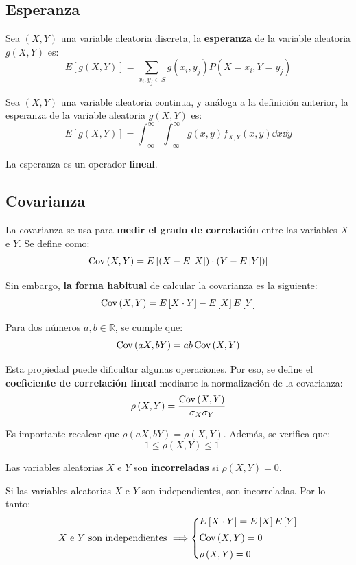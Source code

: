 \documentclass[a4paper]{book}
\begin{document}
\subsection{Esperanza}

Sea $\left(X,Y\right)$ una variable aleatoria discreta, la \textbf{esperanza} de la variable aleatoria $g\left(X,Y\right)$ es:
\[E\left[g\left(X,Y\right)\right] = \sum_{x_i,y_j\in S}g\left(x_i,y_j\right)P\left(X=x_i, Y=y_j\right)\]

Sea $\left(X,Y\right)$ una variable aleatoria continua, y análoga a la definición anterior, la esperanza de la variable aleatoria $g\left(X,Y\right)$ es:
\[E\left[g\left(X,Y\right)\right] = \int_{-\infty}^{\infty}\int_{-\infty}^{\infty}g\left(x,y\right)f_{X,Y}(x,y)\dd{x} \dd{y}\]

La esperanza es un operador \textbf{lineal}.

\subsection{Covarianza}

La covarianza se usa para \textbf{medir el grado de correlación} entre las variables $X$ e $Y$. Se define como:
\[\operatorname{Cov} \left( X,Y \right) = E \left[\left(X-E\left[X\right]\right) \cdot \left(Y - E\left[Y\right]\right)\right]\]

Sin embargo, \textbf{la forma habitual} de calcular la covarianza es la siguiente:
\[\operatorname{Cov} \left( X,Y \right) = E\left[X\cdot Y\right] - E\left[X\right]E\left[Y\right]\]

Para dos números $a,b \in \mathbb{R}$, se cumple que:
\[\operatorname{Cov} \left( aX,bY \right) = ab\operatorname{Cov} \left( X,Y \right)\]

Esta propiedad puede dificultar algunas operaciones. Por eso, se define el \textbf{coeficiente de correlación lineal} mediante la normalización de la covarianza:
\[\rho \left(X,Y\right) = \frac{\operatorname{Cov} \left( X,Y \right)}{\sigma _X \sigma _Y} \]

Es importante recalcar que $\rho \left( aX,bY \right) = \rho \left( X,Y \right) $. Además, se verifica que:
\[-1\leq \rho \left( X,Y \right) \leq 1 \]

Las variables aleatorias $X$ e $Y$ son \textbf{incorreladas} si $\rho \left( X,Y \right)=0$.

Si las variables aleatorias $X$ e $Y$ son independientes, son incorreladas. Por lo tanto:
\[X \text{ e } Y \text{ son independientes} \ \Longrightarrow \left\lbrace \begin{matrix*}[l]
	E \left[ X \cdot Y \right] = E \left[ X \right] E \left[ Y \right] \\[5pt] 
	\Cov \left( X,Y \right) = 0 \\[5pt] 
	\rho \left( X,Y \right) = 0
\end{matrix*} \right. \] 
\end{document}
